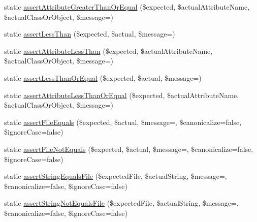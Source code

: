 \begin{DoxyCompactItemize}
\item 
static \mbox{\hyperlink{class_p_h_p_unit___framework___assert_ac2ac7a17e5141158ff1a71189e680245}{assert\+Attribute\+Greater\+Than\+Or\+Equal}} (\$expected, \$actual\+Attribute\+Name, \$actual\+Class\+Or\+Object, \$message=\textquotesingle{}\textquotesingle{})
\item 
static \mbox{\hyperlink{class_p_h_p_unit___framework___assert_a3061d3bf91b15f7c46672ede05961fcb}{assert\+Less\+Than}} (\$expected, \$actual, \$message=\textquotesingle{}\textquotesingle{})
\item 
static \mbox{\hyperlink{class_p_h_p_unit___framework___assert_a999f71e4fd11d099de696aceab081ed9}{assert\+Attribute\+Less\+Than}} (\$expected, \$actual\+Attribute\+Name, \$actual\+Class\+Or\+Object, \$message=\textquotesingle{}\textquotesingle{})
\item 
static \mbox{\hyperlink{class_p_h_p_unit___framework___assert_a558fd461cbd99890e9f36da10e141b48}{assert\+Less\+Than\+Or\+Equal}} (\$expected, \$actual, \$message=\textquotesingle{}\textquotesingle{})
\item 
static \mbox{\hyperlink{class_p_h_p_unit___framework___assert_a6b51137ab3af6e7a9b3133a9bf4ba518}{assert\+Attribute\+Less\+Than\+Or\+Equal}} (\$expected, \$actual\+Attribute\+Name, \$actual\+Class\+Or\+Object, \$message=\textquotesingle{}\textquotesingle{})
\item 
static \mbox{\hyperlink{class_p_h_p_unit___framework___assert_acc26a02f7e92254449f7df55bccf45d9}{assert\+File\+Equals}} (\$expected, \$actual, \$message=\textquotesingle{}\textquotesingle{}, \$canonicalize=false, \$ignore\+Case=false)
\item 
static \mbox{\hyperlink{class_p_h_p_unit___framework___assert_a10eea6ffd54afc524306703b6d872084}{assert\+File\+Not\+Equals}} (\$expected, \$actual, \$message=\textquotesingle{}\textquotesingle{}, \$canonicalize=false, \$ignore\+Case=false)
\item 
static \mbox{\hyperlink{class_p_h_p_unit___framework___assert_a2a12997c933b9e6bd7dee10d8d6f8e68}{assert\+String\+Equals\+File}} (\$expected\+File, \$actual\+String, \$message=\textquotesingle{}\textquotesingle{}, \$canonicalize=false, \$ignore\+Case=false)
\item 
static \mbox{\hyperlink{class_p_h_p_unit___framework___assert_a80ba1638dca3a3232bf430be5099dc16}{assert\+String\+Not\+Equals\+File}} (\$expected\+File, \$actual\+String, \$message=\textquotesingle{}\textquotesingle{}, \$canonicalize=false, \$ignore\+Case=false)
\item 

\end{DoxyCompactItemize}
